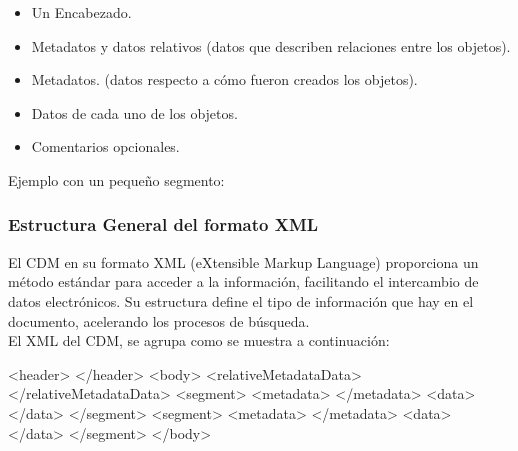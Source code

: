 \begin{itemize}
\itemsep0em
\item Un Encabezado.
\item Metadatos y datos relativos (datos que describen relaciones entre los objetos).
\item Metadatos. (datos respecto a c\'omo fueron creados los objetos).
\item Datos de cada uno de los objetos.
\item Comentarios opcionales.
\end{itemize}

Ejemplo con un peque\~no segmento:\\



\subsubsection*{Estructura General del formato XML}
El CDM en su formato XML (eXtensible Markup Language) proporciona un m\'etodo est\'andar para acceder a la informaci\'on, facilitando el intercambio de datos electr\'onicos. Su estructura define el tipo de informaci\'on que hay en el documento, acelerando los procesos de b\'usqueda.\\
El XML del CDM, se agrupa como se muestra a continuaci\'on:

\begin{verbbox}
<header>
</header>
<body>
  <relativeMetadataData>
  </relativeMetadataData>
  <segment>
    <metadata>
    </metadata>
    <data>
    </data>
  </segment>
  <segment>
    <metadata>
    </metadata>
    <data>
    </data>
  </segment>
</body>\\
\end{verbbox}

